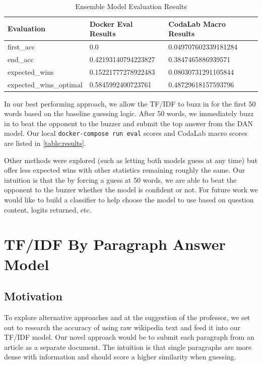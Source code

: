 \documentclass[11pt,a4paper]{article}
\begin{document}
\begin{table}[htb]
\tiny
\begin{tabular}{|l|l|l|}
\hline
Evaluation              & Docker Eval Results & CodaLab Macro Results \\ \hline
first\_acc              & 0.0                 & 0.049707602339181284  \\ \hline
end\_acc                & 0.42193140794223827 & 0.3847465886939571    \\ \hline
expected\_wins          & 0.15221777278922483 & 0.08030731291105844   \\ \hline
expected\_wins\_optimal & 0.5845992400723761  & 0.48729618157593796   \\ \hline
\end{tabular}
\caption{Ensemble Model Evaluation Results}
\label{table:results}
\end{table}

In our best performing approach, we allow the \textsc{TF/IDF} to buzz in for the first 50 words based on the baseline guessing logic.  After 50 words, we immediately buzz in to beat the opponent to the buzzer and submit the  top answer from the \textsc{DAN} model.  Our local \texttt{docker-compose run eval} scores and CodaLab macro scores are listed in \autoref{table:results}.

Other  methods were explored (such as letting both models guess at any time) but offer less expected wins with other statistics remaining roughly the same. Our intuition is that the by forcing a guess at 50 words, we are able to beat the opponent to the buzzer whether the model is confident or not.  For future work we would like to build a classifier to help choose the model to use based on question content, logits returned, etc.


\section{\textsc{TF/IDF} By Paragraph Answer Model}

\subsection{Motivation}
To explore alternative approaches and at the suggestion of the professor, we set out to research the accuracy of using raw wikipedia text and feed it into our \textsc{TF/IDF} model.  Our novel approach would be to submit each paragraph from an article as a separate document.  The intuition is that single paragraphs are more dense with information and should score a higher similarity when guessing.
\end{document}
